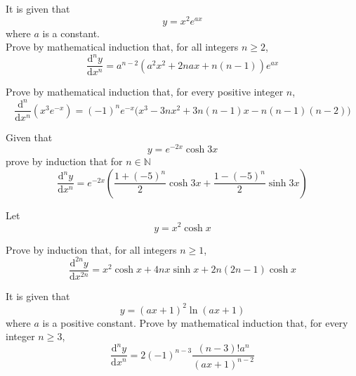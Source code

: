 \documentclass[leqno]{article}
\begin{document}
\djsFrontMatter
\begin{enumerate}[
  label=\textbf{\arabic*.},
  leftmargin=*,
  topsep=0pt,
  partopsep=0pt,
  parsep=0pt
]


\questionitem

It is given that \[y = x^2 e^{ax}\] where $a$ is a constant. \\

Prove by mathematical induction that, for all integers $n \ge 2$,
\[
\frac{\mathrm{d}^n y}{\mathrm{d}x^n} = a^{n-2}\left(a^2x^2 + 2nax + n(n-1)\right)e^{ax}
\] 
\newpage

\questionitem

Prove by mathematical induction that, for every positive integer $n$,
\[
\frac{\mathrm{d}^n}{\mathrm{d}x^n}(x^3 e^{-x}) = (-1)^n e^{-x}\bigl(x^3 - 3n x^2 + 3n(n-1)x - n(n-1)(n-2)\bigr)
\] 

\newpage


\questionitem

Given that
\[
y=e^{-2x}\cosh 3x
\]
prove by induction that for $n \in \mathbb{N}$
\[
\frac{\mathrm{d}^n y}{\mathrm{d}x^n}=e^{-2x}\left(\frac{1+(-5)^n}{2}\cosh 3x+\frac{1-(-5)^n}{2}\sinh 3x\right)
\] 

\newpage

\questionitem

Let \[y = x^2\cosh x\]

Prove by induction that, for all integers $n \ge 1$,
\[
\frac{\mathrm{d}^{2n}y}{\mathrm{d}x^{2n}} = x^2\cosh x + 4nx\sinh x + 2n(2n-1)\cosh x
\] 


\newpage

\questionitem

It is given that \[y = (ax + 1)^2 \ln(ax + 1)\] where $a$ is a positive constant. Prove by mathematical induction that, for every integer $n \ge 3$,
\[
\frac{\mathrm{d}^n y}{\mathrm{d}x^n} = 2(-1)^{n-3} \frac{(n-3)!a^n}{(ax + 1)^{n-2}}
\] 

\newpage

\questionitem


\end{enumerate}
\end{document}
